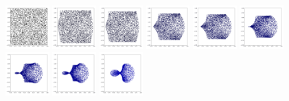 \documentclass[lang=cn,11pt]{elegantpaper}
\begin{document}
\begin{figure}[btbp]
  \centering
  \includegraphics[width=0.15\textwidth]{circle_1_1}
  \includegraphics[width=0.15\textwidth]{circle_1_2}
  \includegraphics[width=0.15\textwidth]{circle_1_3}
  \includegraphics[width=0.15\textwidth]{circle_1_4}
  \includegraphics[width=0.15\textwidth]{circle_1_5}
  \includegraphics[width=0.15\textwidth]{circle_1_6}\\
  \includegraphics[width=0.15\textwidth]{circle_1_7}
  \includegraphics[width=0.15\textwidth]{circle_1_71}
  \includegraphics[width=0.15\textwidth]{circle_1_8}

\end{figure}
\end{document}
